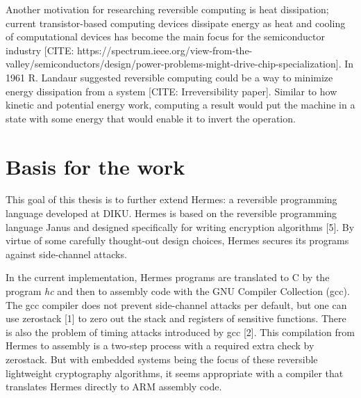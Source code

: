 Another motivation for researching reversible computing is heat dissipation; current transistor-based computing devices dissipate energy as heat and cooling of computational devices has become the main focus for the semiconductor industry [CITE: https://spectrum.ieee.org/view-from-the-valley/semiconductors/design/power-problems-might-drive-chip-specialization]. In 1961 R. Landaur suggested reversible computing could be a way to minimize energy dissipation from a system [CITE: Irreversibility paper]. Similar to how kinetic and potential energy work, computing a result would put the machine in a state with some energy that would enable it to invert the operation.

\section{Basis for the work}
This goal of this thesis is to further extend Hermes: a reversible programming language developed at DIKU.
Hermes is based on the reversible programming language Janus and designed specifically for writing encryption algorithms [5].
By virtue of some carefully thought-out design choices, Hermes secures its programs against side-channel attacks.

In the current implementation, Hermes programs are translated to C by the program \emph{hc} and then to assembly code with the GNU Compiler Collection (gcc). The gcc compiler does not prevent side-channel attacks per default, but one can use zerostack [1] to zero out the stack and registers of sensitive functions.
There is also the problem of timing attacks introduced by gcc [2].
This compilation from Hermes to assembly is a two-step process with a required extra check by zerostack. But with embedded systems being the focus of these reversible lightweight cryptography algorithms, it seems appropriate with a compiler that translates Hermes directly to ARM assembly code.



